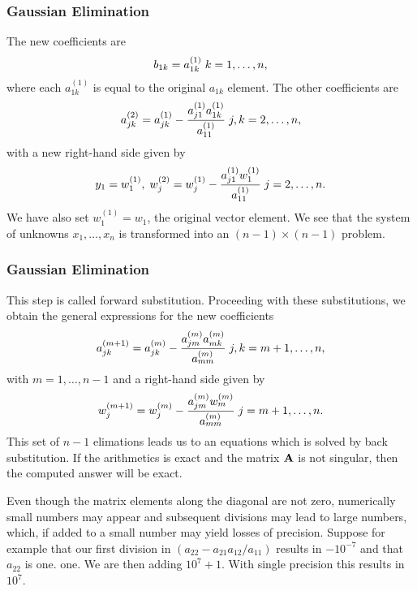 \documentclass[compress]{beamer}
\begin{document}
\frame
{
  \frametitle{Gaussian Elimination}
\begin{small}
{\scriptsize
The new coefficients are
\begin{equation}
   b_{1k} = a_{1k}^{(1)} \hspace{0.1cm} k=1,\dots,n,
\end{equation}
where each $a_{1k}^{(1)}$ is equal to the original $a_{1k}$ element. The other coefficients are
\begin{equation}
   a_{jk}^{(2)} = a_{jk}^{(1)}-\frac{a_{j1}^{(1)}a_{1k}^{(1)}}{a_{11}^{(1)}} \hspace{0.1cm} j,k=2,\dots,n,
\end{equation}
with a new right-hand side given by
\begin{equation}
   y_{1}=w_1^{(1)}, \hspace{0.1cm} w_j^{(2)} =w_j^{(1)}-\frac{a_{j1}^{(1)}w_1^{(1)}}{a_{11}^{(1)}} \hspace{0.1cm} j=2,\dots,n.
\end{equation}
We have also set $w_1^{(1)}=w_1$, the original vector element.
We see that the system of unknowns $x_1,\dots,x_n$ is transformed into an $(n-1)\times (n-1)$ problem.
}
\end{small}
}


\frame
{
  \frametitle{Gaussian Elimination}
\begin{small}
{\scriptsize
This step is called forward substitution.
Proceeding with these substitutions, we obtain the
general expressions for the new coefficients
\begin{equation}
   a_{jk}^{(m+1)} = a_{jk}^{(m)}-\frac{a_{jm}^{(m)}a_{mk}^{(m)}}{a_{mm}^{(m)}} \hspace{0.1cm} j,k=m+1,\dots,n,
\end{equation}
with $m=1,\dots,n-1$ and a
right-hand side given by
\begin{equation}
   w_j^{(m+1)} =w_j^{(m)}-\frac{a_{jm}^{(m)}w_m^{(m)}}{a_{mm}^{(m)}} \hspace{0.1cm} j=m+1,\dots,n.
\end{equation}
This set of $n-1$ elimations leads us to an equations which is solved by back substitution.
If the arithmetics is exact and the matrix ${\bf A}$ is not singular, then the computed answer will be exact.

Even though the matrix elements along the diagonal are not zero,
numerically small numbers may appear and subsequent divisions may lead to large numbers, which, if added
to a small number may yield losses of precision. Suppose for example that our first division in $(a_{22}-a_{21}a_{12}/a_{11})$
results in $-10^{-7}$ and that $a_{22}$ is one.
one. We are then
adding $10^7+1$. With single precision this results in $10^7$.
}
\end{small}
}
\end{document}
